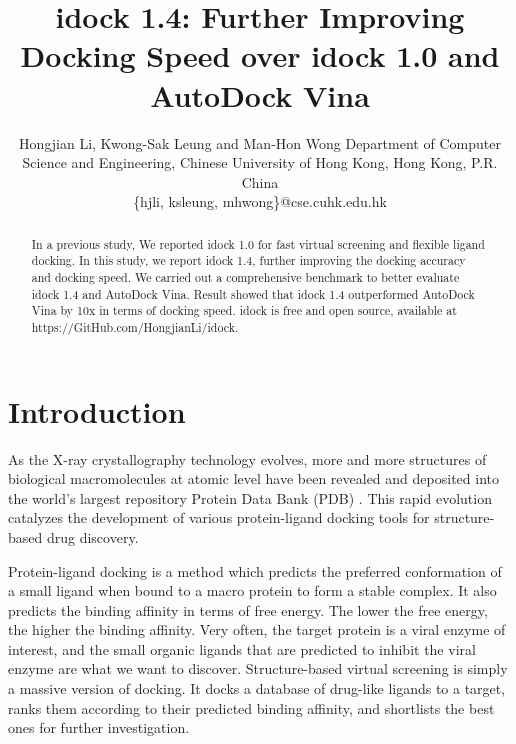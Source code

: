 \documentclass[10pt,conference,compsocconf]{../IEEEtran}
\begin{document}
\title{idock 1.4: Further Improving Docking Speed over idock 1.0 and AutoDock Vina} %
\author
{
\IEEEauthorblockN
{
Hongjian Li, Kwong-Sak Leung and Man-Hon Wong
\IEEEauthorblockA
{
Department of Computer Science and Engineering, Chinese University of Hong Kong, Hong Kong, P.R. China\\
\{hjli, ksleung, mhwong\}@cse.cuhk.edu.hk
}
}
}
\maketitle

\begin{abstract}

In a previous study, We reported idock 1.0 for fast virtual screening and flexible ligand docking. In this study, we report idock 1.4, further improving the docking accuracy and docking speed. We carried out a comprehensive benchmark to better evaluate idock 1.4 and AutoDock Vina. Result showed that idock 1.4 outperformed AutoDock Vina by 10x in terms of docking speed. idock is free and open source, available at https://GitHub.com/HongjianLi/idock.

\end{abstract}

\section{Introduction}

As the X-ray crystallography technology evolves, more and more structures of biological macromolecules at atomic level have been revealed and deposited into the world's largest repository Protein Data Bank (PDB) \cite{539,537}. This rapid evolution catalyzes the development of various protein-ligand docking tools for structure-based drug discovery.

Protein-ligand docking is a method which predicts the preferred conformation of a small ligand when bound to a macro protein to form a stable complex. It also predicts the binding affinity in terms of free energy. The lower the free energy, the higher the binding affinity. Very often, the target protein is a viral enzyme of interest, and the small organic ligands that are predicted to inhibit the viral enzyme are what we want to discover. Structure-based virtual screening is simply a massive version of docking. It docks a database of drug-like ligands to a target, ranks them according to their predicted binding affinity, and shortlists the best ones for further investigation.
\end{document}

